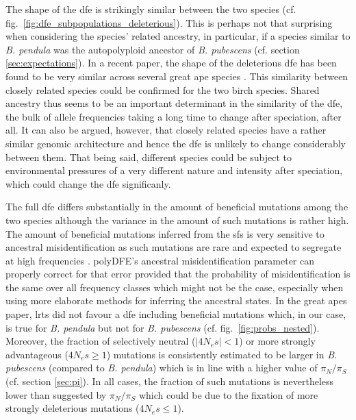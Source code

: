 \documentclass[hidelinks,11pt]{article}
\newcommand{\pendula}{\textit{B. pendula}}
\newcommand{\pubescens}{\textit{B. pubescens}}
\begin{document}
    The shape of the \acrshort{dfe} is strikingly similar between the two species (cf. fig.~\ref{fig:dfe_subpopulations_deleterious}). This is perhaps not that surprising when considering the species' related ancestry, in particular, if a species similar to \pendula{} was the autopolyploid ancestor of \pubescens{} (cf. section \ref{sec:expectations}). In a recent paper, the shape of the deleterious \acrshort{dfe} has been found to be very similar across several great ape species \cite{dfe-similarity-across-species}. This similarity between closely related species could be confirmed for the two birch species. Shared ancestry thus seems to be an important determinant in the similarity of the \acrshort{dfe}, the bulk of allele frequencies taking a long time to change after speciation, after all. It can also be argued, however, that closely related species have a rather similar genomic architecture and hence the \acrshort{dfe} is unlikely to change considerably between them. That being said, different species could be subject to environmental pressures of a very different nature and intensity after speciation, which could change the \acrshort{dfe} significanly.

    The full \acrshort{dfe} differs substantially in the amount of beneficial mutations among the two species although the variance in the amount of such mutations is rather high. The amount of beneficial mutations inferred from the \acrshort{sfs} is very sensitive to ancestral misidentification as such mutations are rare and expected to segregate at high frequencies \cite{polydfe}. polyDFE's ancestral misidentification parameter can properly correct for that error provided that the probability of misidentification is the same over all frequency classes which might not be the case, especially when using more elaborate methods for inferring the ancestral states. In the great apes paper, \acrlong{lrt}s did not favour a \acrshort{dfe} including beneficial mutations which, in our case, is true for \pendula{} but not for \pubescens{} (cf. fig.~\ref{fig:probs_nested}). Moreover, the fraction of selectively neutral ($|4N_es| < 1$) or more strongly advantageous ($4N_es \geq 1$) mutations is consistently estimated to be larger in \pubescens{} (compared to \pendula{}) which is in line with a higher value of $\pi_N/\pi_S$ (cf. section \ref{sec:pi}). In all cases, the fraction of such mutations is nevertheless lower than suggested by $\pi_N/\pi_S$ which could be due to the fixation of more strongly deleterious mutations ($4N_es \leq 1$).
\end{document}
